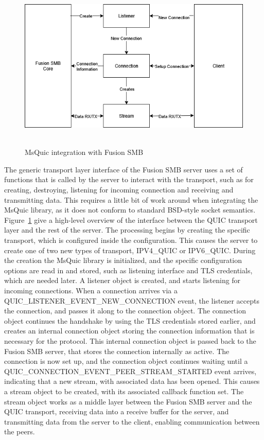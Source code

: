 \documentclass[english, 12pt, a4paper, elec, utf8, a-2b, online]{aaltothesis}
\begin{document}
\begin{figure}[h]
	\centering
	\includegraphics[alt={Block diagram of the flow between Fusion SMB and MsQuic}, height=7.4cm]{./images/MsQuic_integration.png}
	\caption{MsQuic integration with Fusion SMB}
	\label{fig:msquic_int}
\end{figure}

The generic transport layer interface of the Fusion SMB server uses a set of functions
that is called by the server to interact with the transport, such as for creating,
destroying, listening for incoming connection and receiving and transmitting data.
This requires a little bit of work around when integrating the MsQuic library, as
it does not conform to standard BSD-style socket semantics. Figure~\ref{fig:msquic_int}
give a high-level overview of the interface between the QUIC transport layer and the
rest of the server. The processing begins by creating the specific transport, which
is configured inside the configuration. This causes the server to create one of two
new types of transport, IPV4\_QUIC or IPV6\_QUIC. During the creation the MsQuic
library is initialized, and the specific configuration options are read in and stored,
such as listening interface and TLS credentials, which are needed later. A listener
object is created, and starts listening for incoming connections. When a connection
arrives via a QUIC\_LISTENER\_EVENT\_NEW\_CONNECTION event, the listener accepts the connection, and passes it along to the
connection object. The connection object continues the handshake by using the TLS
credentials stored earlier, and creates an internal connection object storing
the connection information that is necessary for the protocol. This internal connection
object is passed back to the Fusion SMB server, that stores the connection internally
as active. The connection is now set up, and the connection object continues waiting
until a QUIC\_CONNECTION\_EVENT\_PEER\_STREAM\_STARTED event arrives, indicating
that a new stream, with associated data has been opened. This causes a stream object
to be created, with its associated callback function set. The stream object works
as a middle layer between the Fusion SMB server and the QUIC transport, receiving
data into a receive buffer for the server, and transmitting data from the server to
the client, enabling communication between the peers.
\end{document}
